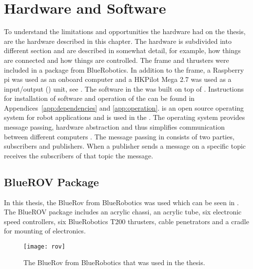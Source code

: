 \chapter{Hardware and Software}\label{cha:hardware}
To understand the limitations and opportunities the hardware had on the thesis, are the hardware described in this chapter. The hardware is subdivided into different section and are described in somewhat detail, for example, how things are connected and how things are controlled. The \abbrROV frame and thrusters were included in a package from BlueRobotics. In addition to the \abbrROV frame, a Raspberry pi was used as an onboard computer and a HKPilot Mega 2.7  was used as a input/output (\abbrIO) unit, see . The software in the \abbrROV was built on top of \abbrROS.  Instructions for installation of software and operation of the \abbrROV can be found in Appendices~\ref{app:dependencies} and \ref{app:operation}. \abbrROS is an open source operating system for robot applications and is used in the \abbrROV. The operating system provides message passing, hardware abstraction and thus simplifies communication between different computers \citep{ROS}. The message passing in \abbrROS consists of two parties, subscribers and publishers. When a publisher sends a message on a specific topic receives the subscribers of that topic the message. 

\section{BlueROV Package}
In this thesis, the BlueRov from BlueRobotics was used which can be seen in . The BlueROV package includes an acrylic chassi, an acrylic tube, six electronic speed controllers, six BlueRobotics T200 thrusters, cable penetrators and a cradle for mounting of electronics.
\begin{figure}
\centering
\texttt{[image: rov]}
\caption{The BlueRov from BlueRobotics that was used in the thesis.}
\label{fig:rov}
\end{figure}

